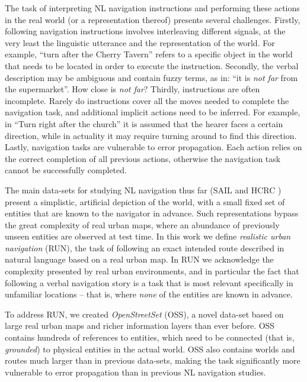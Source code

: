 \documentclass[11pt,a4paper]{article}
\begin{document}
The task of interpreting NL navigation instructions and performing these actions in the real world (or a representation thereof) presents several challenges. Firstly, following navigation instructions involves interleaving different  signals,  at the very least the linguistic utterance and the representation of the world. For example, \enquote {turn after the Cherry Tavern} refers to a specific object in the  world that needs to be located in order to execute the instruction. %
Secondly, the verbal description may be ambiguous and contain fuzzy terms, as in: \enquote {it is {\em  not far} from the supermarket}. How close is {\em not far}? Thirdly,   instructions are often incomplete. Rarely do instructions cover all the moves needed to complete the navigation task, and  additional implicit actions need to be inferred. For example, in ``Turn right after the church'' it is assumed that the hearer faces a certain direction, while in actuality it may require turning around to find this direction. Lastly,
navigation tasks are vulnerable to error propagation. Each action relies on the correct completion of all previous actions, otherwise the navigation task cannot be successfully completed.  \par


The main data-sets  for studying  NL navigation  thus far (SAIL \cite{macmahon2006walk} and HCRC \cite{anderson1991hcrc}) present a  simplistic, artificial depiction of the world, with a small fixed set of entities that are known to the navigator in advance. Such representations bypass the great complexity of real urban maps, where an abundance of previously  unseen entities are observed at test time. 
In this work we define  {\em realistic urban navigation} (RUN), the task of following an exact  intended route described in natural language based on a real urban map. In  RUN we acknowledge the complexity presented by real urban environments, and in particular the  fact that following a verbal  navigation story  is a task that is most relevant specifically in unfamiliar locations -- that is, where {\em none} of the entities are known in advance.

To address  RUN, we created {\em OpenStreetSet} (OSS), a novel data-set based on large real urban maps and richer information layers than ever before. OSS contains hundreds of references to  entities, which need to be connected (that is,  {\em grounded}) to physical entities in the actual world.  %
OSS also contains worlds and routes much larger than in previous data-sets, making the   task significantly more vulnerable to error propagation than in previous NL navigation studies. 
 
\end{document}
